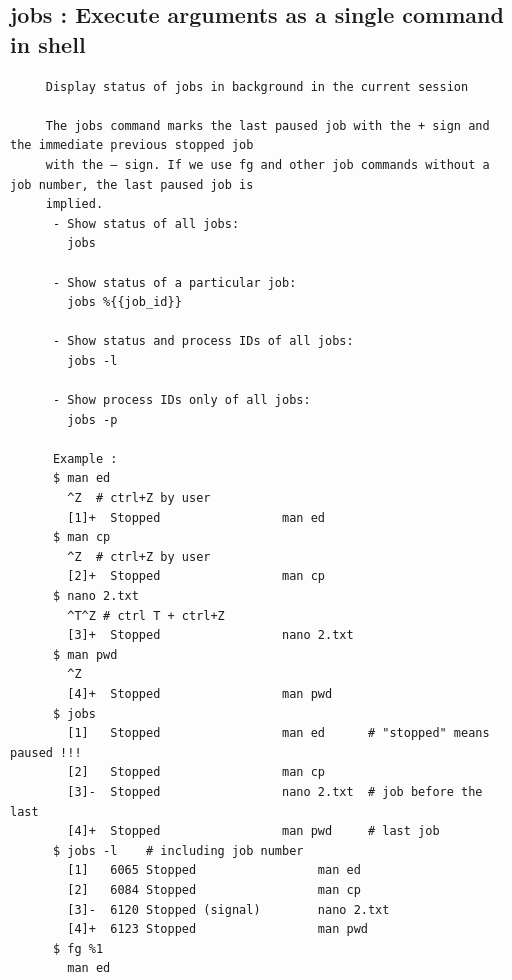 \documentclass[a4paper,12pt]{article}
\begin{document}
\subsection{jobs   : Execute arguments as a single command in shell }
\begin{verbatim}
     Display status of jobs in background in the current session     
     
     The jobs command marks the last paused job with the + sign and the immediate previous stopped job   
     with the – sign. If we use fg and other job commands without a job number, the last paused job is  
     implied.
      - Show status of all jobs:
        jobs
      
      - Show status of a particular job:
        jobs %{{job_id}}

      - Show status and process IDs of all jobs:
        jobs -l

      - Show process IDs only of all jobs:
        jobs -p
        
      Example : 
      $ man ed
        ^Z  # ctrl+Z by user
        [1]+  Stopped                 man ed
      $ man cp
        ^Z  # ctrl+Z by user
        [2]+  Stopped                 man cp
      $ nano 2.txt
        ^T^Z # ctrl T + ctrl+Z
        [3]+  Stopped                 nano 2.txt   
      $ man pwd
        ^Z
        [4]+  Stopped                 man pwd
      $ jobs
        [1]   Stopped                 man ed      # "stopped" means paused !!!
        [2]   Stopped                 man cp
        [3]-  Stopped                 nano 2.txt  # job before the last 
        [4]+  Stopped                 man pwd     # last job
      $ jobs -l    # including job number
        [1]   6065 Stopped                 man ed
        [2]   6084 Stopped                 man cp
        [3]-  6120 Stopped (signal)        nano 2.txt
        [4]+  6123 Stopped                 man pwd
      $ fg %1
        man ed
\end{verbatim}
\end{document}
